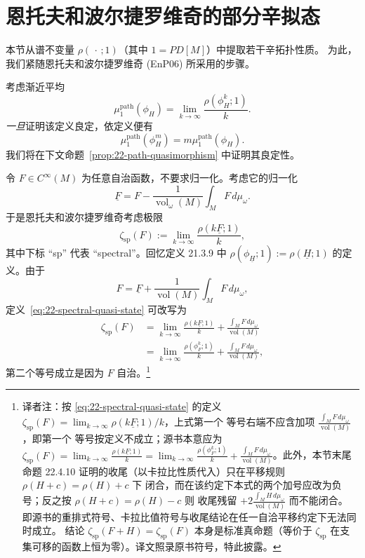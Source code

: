 \section{恩托夫和波尔捷罗维奇的部分辛拟态}

本节从谱不变量 $\rho(\,\cdot\,;1)$（其中 $1=PD[M]$）中提取若干辛拓扑性质。
为此，我们紧随恩托夫和波尔捷罗维奇 (EnP06) 所采用的步骤。

考虑渐近平均
\begin{equation}
 \mu_1^{\mathrm{path}}(\phi_H)
 =\lim_{k\to\infty}\frac{\rho(\phi_H^k;1)}{k}.
 \label{eq:22-path-asymptotic-average}
\end{equation}
\emph{一旦}证明该定义良定，依定义便有
\begin{equation}
 \mu_1^{\mathrm{path}}(\phi_H^m)=m\mu_1^{\mathrm{path}}(\phi_H).
 \label{eq:22-path-homogeneity}
\end{equation}
我们将在下文命题~\ref{prop:22-path-quasimorphism} 中证明其良定性。

令 $F\in C^\infty(M)$ 为任意自治函数，不要求归一化。考虑它的归一化
\[
 \underline F=F-\frac{1}{\operatorname{vol}_\omega(M)}\int_M F\,d\mu_\omega.
\]
于是恩托夫和波尔捷罗维奇考虑极限
\begin{equation}
 \zeta_{\mathrm{sp}}(F):=\lim_{k\to\infty}\frac{\rho(k\underline F;1)}{k},
 \label{eq:22-spectral-quasi-state}
\end{equation}
其中下标 ``sp'' 代表 ``spectral''。回忆定义 21.3.9 中
$\rho(\phi_{\underline H};1):=\rho(\underline H;1)$ 的定义。由于
\[
 F=\underline F+\frac{1}{\operatorname{vol}(M)}\int_M F\,d\mu_\omega,
\]
定义~\eqref{eq:22-spectral-quasi-state} 可改写为
\begin{align*}
 \zeta_{\mathrm{sp}}(F)
 &=\lim_{k\to\infty}\frac{\rho(k\underline F;1)}{k}
   +\frac{\int_M F\,d\mu_\omega}{\operatorname{vol}(M)}\\
 &=\lim_{k\to\infty}\frac{\rho(\phi_F^k;1)}{k}
   +\frac{\int_M F\,d\mu_\omega}{\operatorname{vol}(M)},
\end{align*}
第二个等号成立是因为 $F$ 自治。\footnote{译者注：按
\eqref{eq:22-spectral-quasi-state} 的定义
$\zeta_{\mathrm{sp}}(F)=\lim_{k\to\infty}\rho(k\underline F;1)/k$，上式第一个
等号右端不应含加项 $\frac{\int_MF\,d\mu_\omega}{\operatorname{vol}(M)}$，即第一个
等号按定义不成立；源书本意应为
$\zeta_{\mathrm{sp}}(F)=\lim_{k\to\infty}\frac{\rho(k\underline F;1)}{k}
=\lim_{k\to\infty}\frac{\rho(\phi_F^k;1)}{k}
+\frac{\int_MF\,d\mu_\omega}{\operatorname{vol}(M)}$。此外，本节末尾命题
22.4.10 证明的收尾（以卡拉比性质代入）只在平移规则 $\rho(H+c)=\rho(H)+c$ 下
闭合，而在该约定下本式的两个加号应改为负号；反之按 $\rho(H+c)=\rho(H)-c$ 则
收尾残留 $+2\frac{\int_MH\,d\mu_\omega}{\operatorname{vol}(M)}$ 而不能闭合。
即源书的重排式符号、卡拉比值符号与收尾结论在任一自洽平移约定下无法同时成立。
结论 $\zeta_{\mathrm{sp}}(F+H)=\zeta_{\mathrm{sp}}(F)$ 本身是标准真命题（等价于
$\zeta_{\mathrm{sp}}$ 在支集可移的函数上恒为零）。译文照录原书符号，特此披露。}

